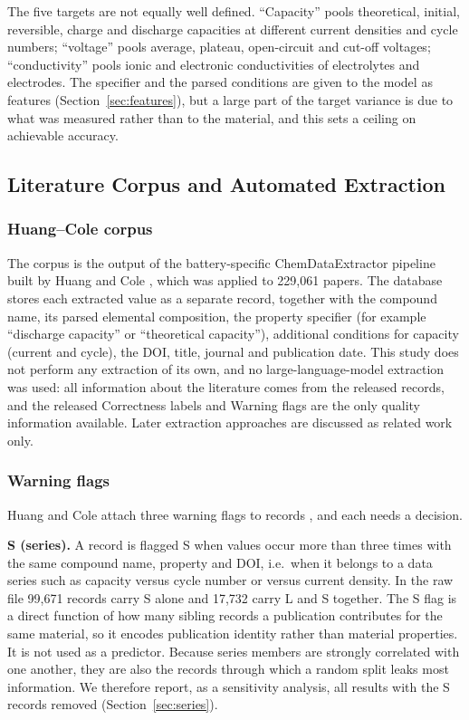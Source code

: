\documentclass[journal=jcisd8,manuscript=article,layout=traditional]{achemso}
\begin{document}
The five targets are not equally well defined. ``Capacity'' pools theoretical, initial, reversible, charge and discharge capacities at different current densities and cycle numbers; ``voltage'' pools average, plateau, open-circuit and cut-off voltages; ``conductivity'' pools ionic and electronic conductivities of electrolytes and electrodes. The specifier and the parsed conditions are given to the model as features (Section~\ref{sec:features}), but a large part of the target variance is due to what was measured rather than to the material, and this sets a ceiling on achievable accuracy.

\subsection{Literature Corpus and Automated Extraction}

\subsubsection{Huang--Cole corpus}

The corpus is the output of the battery-specific ChemDataExtractor pipeline built by Huang and Cole \cite{huang2020database,huang2020figshare}, which was applied to 229,061 papers. The database stores each extracted value as a separate record, together with the compound name, its parsed elemental composition, the property specifier (for example ``discharge capacity'' or ``theoretical capacity''), additional conditions for capacity (current and cycle), the DOI, title, journal and publication date. This study does not perform any extraction of its own, and no large-language-model extraction was used: all information about the literature comes from the released records, and the released Correctness labels and Warning flags are the only quality information available. Later extraction approaches \cite{huang2022batterybert,xu2024atomworkbattery,dagdelen2024structured} are discussed as related work only.

\subsubsection{Warning flags}
\label{sec:warnings}

Huang and Cole attach three warning flags to records \cite{huang2020database}, and each needs a decision.

\textbf{S (series).} A record is flagged S when values occur more than three times with the same compound name, property and DOI, i.e.\ when it belongs to a data series such as capacity versus cycle number or versus current density. In the raw file 99,671 records carry S alone and 17,732 carry L and S together. The S flag is a direct function of how many sibling records a publication contributes for the same material, so it encodes publication identity rather than material properties. It is not used as a predictor. Because series members are strongly correlated with one another, they are also the records through which a random split leaks most information. We therefore report, as a sensitivity analysis, all results with the S records removed (Section~\ref{sec:series}).
\end{document}
